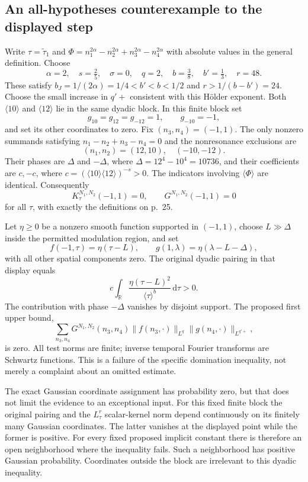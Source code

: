 \documentclass[10pt]{article}
\begin{document}
\subsection*{An all-hypotheses counterexample to the displayed step}
Write \(\tau=\tilde\tau_1\) and \(\Phi=n_1^{2\alpha}-n_2^{2\alpha}+n_3^{2\alpha}-n_4^{2\alpha}\) with absolute values in the general definition. Choose \[\alpha=2,\quad s=\tfrac25,\quad \sigma=0,\quad q=2,
 \quad b=\tfrac38,\quad b'=\tfrac13,\quad r=48.\] These satisfy \(b_J=1/(2\alpha)=1/4<b'<b<1/2\) and \(r>1/(b-b')=24\). Choose the small increase in \(q'+\) consistent with this Hölder exponent. Both \(\langle 10\rangle\) and \(\langle 12\rangle\) lie in the same dyadic block. In this finite block set \[g_{10}=g_{12}=g_{-12}=1,\qquad g_{-10}=-1,\] and set its other coordinates to zero. Fix \((n_3,n_4)=(-1,1)\). The only nonzero summands satisfying \(n_1-n_2+n_3-n_4=0\) and the nonresonance exclusions are \[(n_1,n_2)=(12,10),\quad(-10,-12).\] Their phases are \(\Delta\) and \(-\Delta\), where \(\Delta=12^4-10^4=10736\), and their coefficients are \(c,-c\), where \(c=(\langle 10\rangle\langle 12\rangle)^{-s}>0\). The indicators involving \(\langle \Phi\rangle\) are identical. Consequently \[K_\tau^{N_1,N_2}(-1,1)=0,\qquad
 G^{N_1,N_2}(-1,1)=0\] for all \(\tau\), with exactly the definitions on p. 25.\par
Let \(\eta\ge0\) be a nonzero smooth function supported in \((-1,1)\), choose \(L\gg\Delta\) inside the permitted modulation region, and set \[f(-1,\tau)=\eta(\tau-L),\qquad
 g(1,\lambda)=\eta(\lambda-L-\Delta),\] with all other spatial components zero. The original dyadic pairing in that display equals \[c\int_\mathbb R\frac{\eta(\tau-L)^2}{\langle \tau\rangle^b}\,\mathrm d\tau>0.\] The contribution with phase \(-\Delta\) vanishes by disjoint support. The proposed first upper bound, \[\sum_{n_3,n_4}G^{N_1,N_2}(n_3,n_4)
       \|f(n_3,\cdot)\|_{L^q}
       \|g(n_4,\cdot)\|_{L^{q'+}},\] is zero. All test norms are finite; inverse temporal Fourier transforms are Schwartz functions. This is a failure of the specific domination inequality, not merely a complaint about an omitted estimate.\par
The exact Gaussian coordinate assignment has probability zero, but that does not limit the evidence to an exceptional input. For this fixed finite block the original pairing and the \(L^r_\tau\) scalar-kernel norm depend continuously on its finitely many Gaussian coordinates. The latter vanishes at the displayed point while the former is positive. For every fixed proposed implicit constant there is therefore an open neighborhood where the inequality fails. Such a neighborhood has positive Gaussian probability. Coordinates outside the block are irrelevant to this dyadic inequality.\par
\end{document}
